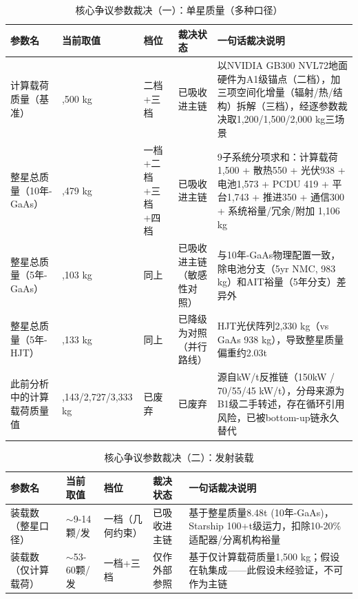 \begin{table}[H]
  \centering
  \caption{核心争议参数裁决（一）：单星质量（多种口径）}
  \label{tab:core-verdicts-mass}
  \small
  \begin{tabularx}{\textwidth}{
    >{\raggedright\arraybackslash}p{2.7cm}
    >{\raggedright\arraybackslash}p{2.2cm}
    >{\centering\arraybackslash}p{1.5cm}
    >{\raggedright\arraybackslash}p{2.1cm}
    >{\raggedright\arraybackslash}X
  }
  \toprule
  \textbf{参数名} & \textbf{当前取值} & \textbf{档位} & \textbf{裁决状态} & \textbf{一句话裁决说明} \\
  \midrule
  计算载荷质量（基准） & 1,500 kg & 二档+三档 & 已吸收进主链 & 以NVIDIA GB300 NVL72地面硬件为A1级锚点（二档），加三项空间化增量（辐射/热/结构）拆解（三档），经逐参数裁决取1,200/1,500/2,000 kg三场景 \\
  整星总质量（10年-GaAs） & 8,479 kg & 一档+二档+三档+四档 & 已吸收进主链 & 9子系统分项求和：计算载荷1,500 + 散热550 + 光伏938 + 电池1,573 + PCDU 419 + 平台1,743 + 推进350 + 通信300 + 系统裕量/冗余/附加 1,106 kg \\
  整星总质量（5年-GaAs） & 7,103 kg & 同上 & 已吸收进主链（敏感性对照） & 与10年-GaAs物理配置一致，除电池分支（5yr NMC, 983 kg）和AIT裕量（5年分支）差异外 \\
  整星总质量（5年-HJT） & 9,133 kg & 同上 & 已降级为对照（并行路线） & HJT光伏阵列2,330 kg（vs GaAs 938 kg），导致整星质量偏重约2.03t \\
  此前分析中的计算载荷质量值 & 2,143/2,727/3,333 kg & 已废弃 & 已废弃 & 源自kW/t反推链（150kW / 70/55/45 kW/t），分母来源为B1级二手转述，存在循环引用风险，已被bottom-up链永久替代 \\
  \bottomrule
  \end{tabularx}
\end{table}

\begin{table}[H]
  \centering
  \caption{核心争议参数裁决（二）：发射装载}
  \label{tab:core-verdicts-launch}
  \small
  \begin{tabularx}{\textwidth}{
    >{\raggedright\arraybackslash}p{2.7cm}
    >{\raggedright\arraybackslash}p{2.2cm}
    >{\centering\arraybackslash}p{1.5cm}
    >{\raggedright\arraybackslash}p{2.1cm}
    >{\raggedright\arraybackslash}X
  }
  \toprule
  \textbf{参数名} & \textbf{当前取值} & \textbf{档位} & \textbf{裁决状态} & \textbf{一句话裁决说明} \\
  \midrule
  装载数（整星口径） & $\sim$9-14颗/发 & 一档（几何约束） & 已吸收进主链 & 基于整星质量8.48t (10年-GaAs)，Starship 100+t级运力，扣除10-20\%适配器/分离机构裕量 \\
  装载数（仅计算载荷） & $\sim$53-60颗/发 & 一档+三档 & 仅作外部参照 & 基于仅计算载荷质量1,500 kg；假设在轨集成——此假设未经验证，不可作为主链 \\
  \bottomrule
  \end{tabularx}
\end{table}

